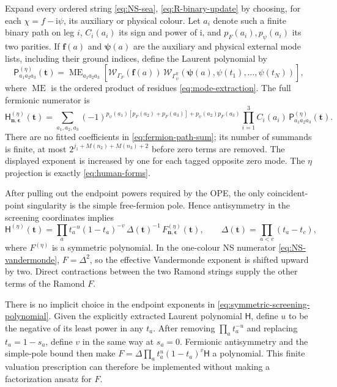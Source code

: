 \documentclass[11pt]{article}
\newcommand{\eps}{\epsilon}
\newcommand{\ii}{\mathrm i}
\begin{document}
Expand every ordered string \eqref{eq:NS-sea}, \eqref{eq:R-binary-update} by choosing,
for each $\chi=f-\ii\psi$, its auxiliary or physical colour.  Let
$a_i$ denote such a finite binary path on leg $i$, $C_i(a_i)$ its sign and
power of $\ii$, and $p_F(a_i),p_\psi(a_i)$ its two parities.  If
$\mathbf f(a)$ and $\boldsymbol\psi(a)$ are the auxiliary and physical
external mode lists, including their ground indices, define the Laurent
polynomial by
\begin{equation}
 \mathsf P^{(\eta)}_{a_1a_2a_3}(\boldsymbol t)
 =\operatorname{ME}_{a_1a_2a_3}\!\left[
 \mathcal W_{\Gamma_F}(\mathbf f(a))\,
 \mathcal W_{\Gamma_\psi^{\eta}}
 (\boldsymbol\psi(a),\psi(t_1),\ldots,\psi(t_N))\right],
 \label{eq:P-explicit}
\end{equation}
where $\operatorname{ME}$ is the ordered product of residues
\eqref{eq:mode-extraction}.  The full fermionic
numerator is
\begin{equation}
 \mathsf H^{(\eta)}_{\boldsymbol n,\boldsymbol\eps}(\boldsymbol t)
 =\sum_{a_1,a_2,a_3}
 (-1)^{p_\psi(a_1)[p_F(a_2)+p_F(a_3)]+p_\psi(a_2)p_F(a_3)}
 \prod_{i=1}^3 C_i(a_i)\,
 \mathsf P^{(\eta)}_{a_1a_2a_3}(\boldsymbol t).
 \label{eq:fermion-path-sum}
\end{equation}
There are no fitted coefficients in \eqref{eq:fermion-path-sum}; its number
of summands is finite, at most $2^{j_1+M(n_2)+M(n_3)+2}$ before zero terms
are removed.  The displayed exponent is increased by one for each tagged
opposite zero mode.  The $\eta$ projection is exactly
\eqref{eq:human-forms}.

After pulling out the endpoint powers required by the OPE, the only
coincident-point singularity is the simple free-fermion pole.  Hence
antisymmetry in the screening coordinates implies
\begin{equation}
 \mathsf H^{(\eta)}(\boldsymbol t)
 =\prod_a t_a^{-u}(1-t_a)^{-v}\,\Delta(\boldsymbol t)^{-1}\,
 F^{(\eta)}_{\boldsymbol n,\boldsymbol\eps}(\boldsymbol t),
 \qquad \Delta(\boldsymbol t)=\prod_{a<c}(t_a-t_c),
 \label{eq:symmetric-screening-polynomial}
\end{equation}
where $F^{(\eta)}$ is a symmetric polynomial.  In the one-colour NS
numerator \eqref{eq:NS-vandermonde}, $F=\Delta^2$, so the effective
Vandermonde exponent is shifted upward by two.  Direct contractions between
the two Ramond strings supply the other terms of the Ramond $F$.

There is no implicit choice in the endpoint exponents in
\eqref{eq:symmetric-screening-polynomial}.  Given the explicitly extracted
Laurent polynomial $\mathsf H$, define $u$ to be the negative of its least
power in any $t_a$.  After removing $\prod_at_a^{-u}$ and replacing
$t_a=1-s_a$, define $v$ in the same way at $s_a=0$.  Fermionic
antisymmetry and the simple-pole bound then make
$F=\Delta\prod_at_a^u(1-t_a)^v\mathsf H$ a polynomial.  This finite
valuation prescription can therefore be implemented without making a
factorization ansatz for $F$.
\end{document}
